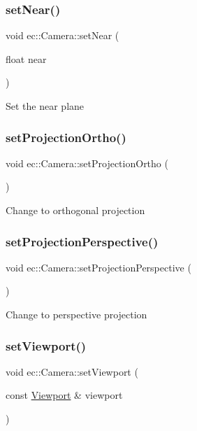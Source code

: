 \subsubsection{\texorpdfstring{set\+Near()}{setNear()}}
{\footnotesize\ttfamily void ec\+::\+Camera\+::set\+Near (\begin{DoxyParamCaption}\item[{float}]{near }\end{DoxyParamCaption})}

Set the near plane \mbox{\label{classec_1_1_camera_ae36280401efe1d0f5bef9997952f8814}} 
\subsubsection{\texorpdfstring{set\+Projection\+Ortho()}{setProjectionOrtho()}}
{\footnotesize\ttfamily void ec\+::\+Camera\+::set\+Projection\+Ortho (\begin{DoxyParamCaption}{ }\end{DoxyParamCaption})}

Change to orthogonal projection \mbox{\label{classec_1_1_camera_af3544fbe030aadcd6bdfef8cb94e7b5c}} 
\subsubsection{\texorpdfstring{set\+Projection\+Perspective()}{setProjectionPerspective()}}
{\footnotesize\ttfamily void ec\+::\+Camera\+::set\+Projection\+Perspective (\begin{DoxyParamCaption}{ }\end{DoxyParamCaption})}

Change to perspective projection \mbox{\label{classec_1_1_camera_a3fc6f03041f6c0ee897c9596039d424d}} 
\subsubsection{\texorpdfstring{set\+Viewport()}{setViewport()}}
{\footnotesize\ttfamily void ec\+::\+Camera\+::set\+Viewport (\begin{DoxyParamCaption}\item[{const \mbox{\hyperlink{classec_1_1_viewport}{Viewport}} \&}]{viewport }\end{DoxyParamCaption})}

